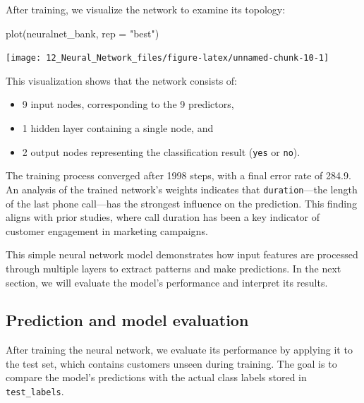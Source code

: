 \documentclass[
  11pt,
]{book}
\makeatletter
\newenvironment{Shaded}{}{}
\newcommand{\AttributeTok}[1]{#1}
\newcommand{\FunctionTok}[1]{#1}
\newcommand{\NormalTok}[1]{#1}
\newcommand{\StringTok}[1]{\textcolor[rgb]{0.39,0.39,0.39}{#1}}
\providecommand{\tightlist}{%
  \setlength{\itemsep}{0pt}\setlength{\parskip}{0pt}}
\newenvironment{kframe}{%
\medskip{}
\setlength{\fboxsep}{.8em}
 \def\at@end@of@kframe{}%
 \ifinner\ifhmode%
  \def\at@end@of@kframe{\end{minipage}}%
  \begin{minipage}{\columnwidth}%
 \fi\fi%
 \def\FrameCommand##1{\hskip\@totalleftmargin \hskip-\fboxsep
 \colorbox{shadecolor}{##1}\hskip-\fboxsep
     \hskip-\linewidth \hskip-\@totalleftmargin \hskip\columnwidth}%
 \MakeFramed {\advance\hsize-\width
   \@totalleftmargin\z@ \linewidth\hsize
   \@setminipage}}%
 {\par\unskip\endMakeFramed%
 \at@end@of@kframe}
\renewenvironment{Shaded}{\begin{kframe}}{\end{kframe}}
\theoremstyle{definition}
\theoremstyle{definition}
\theoremstyle{definition}
\theoremstyle{definition}
\theoremstyle{remark}
\makeatother
\begin{document}
After training, we visualize the network to examine its topology:

\begin{Shaded}
\begin{Highlighting}[]
\FunctionTok{plot}\NormalTok{(neuralnet\_bank, }\AttributeTok{rep =} \StringTok{"best"}\NormalTok{)}
\end{Highlighting}
\end{Shaded}

\begin{center}\texttt{[image: 12\_Neural\_Network\_files/figure-latex/unnamed-chunk-10-1]} \end{center}

This visualization shows that the network consists of:

\begin{itemize}
\tightlist
\item
  9 input nodes, corresponding to the 9 predictors,\\
\item
  1 hidden layer containing a single node, and\\
\item
  2 output nodes representing the classification result (\texttt{yes} or \texttt{no}).
\end{itemize}

The training process converged after 1998 steps, with a final error rate of 284.9. An analysis of the trained network's weights indicates that \texttt{duration}---the length of the last phone call---has the strongest influence on the prediction. This finding aligns with prior studies, where call duration has been a key indicator of customer engagement in marketing campaigns.

This simple neural network model demonstrates how input features are processed through multiple layers to extract patterns and make predictions. In the next section, we will evaluate the model's performance and interpret its results.

\subsection*{Prediction and model evaluation}\label{prediction-and-model-evaluation-2}


After training the neural network, we evaluate its performance by applying it to the test set, which contains customers unseen during training. The goal is to compare the model's predictions with the actual class labels stored in \texttt{test\_labels}.
\end{document}
